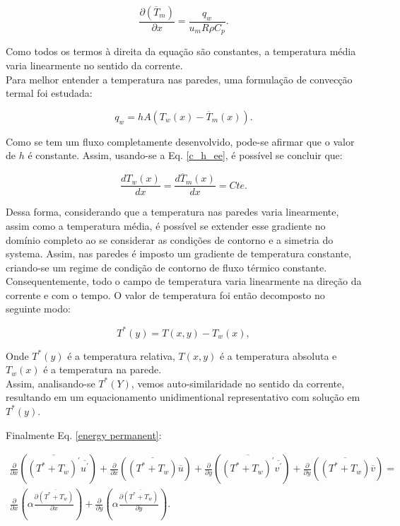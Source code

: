 \begin{equation}\label{c_h_ee}
\frac{\partial{\left(\overline{T}_m\right)}}{\partial{x}} = \frac{q_w}{u_m R \rho C_p}.
\end{equation}

Como todos os termos à direita da equação são constantes, a temperatura média varia linearmente no sentido da corrente.\\
Para melhor entender a temperatura nas paredes, uma formulação de convecção termal foi estudada:

\begin{equation}
q_w = h A \left( T_w(x) - \overline{T}_m(x)\right).
\end{equation}

Como se tem um fluxo completamente desenvolvido, pode-se afirmar que o valor de $h$ é constante. Assim, usando-se a Eq. \ref{c_h_ee}, é possível se concluir que:

\begin{equation}
\frac{d T_w(x)}{d x} = \frac{d \overline{T}_m(x)}{d x} = Cte.
\end{equation}	

Dessa forma, considerando que a temperatura nas paredes varia linearmente, assim como a temperatura média, é possível se extender esse gradiente no domínio completo ao se considerar as condições de contorno e a simetria do systema. Assim, nas paredes é imposto um gradiente de temperatura constante, criando-se um regime de condição de contorno de fluxo térmico constante. Consequentemente, todo o campo de temperatura varia linearmente na direção da corrente e com o tempo.
O valor de temperatura foi então decomposto no seguinte modo:

\begin{equation}
   T^\ast(y) = T(x,y) - T_w(x),
\end{equation}


 Onde $T^\ast(y)$ é a temperatura relativa, $T(x,y)$ é a temperatura absoluta e $T_w(x)$ é a temperatura na parede.\\

 Assim, analisando-se $T^\ast(Y)$, vemos auto-similaridade no sentido da corrente, resultando em um equacionamento unidimentional representativo com solução em $T^\ast(y)$.

 Finalmente Eq. \ref{energy permanent}:

\begin{equation}
\begin{split}
\frac{\partial{}}{\partial{x}} \left(\overline{(T^\ast + T_w)^\prime} \overline{ u^\prime}\right) + \frac{\partial{}}{\partial{x}}\left(\overline{(T^\ast + T_w)} \overline{u}\right)+ 
\frac{\partial{}}{\partial{y}} \left(\overline{(T^\ast + T_w)^\prime} \overline{ v^\prime}\right) + \frac{\partial{}}{\partial{y}}\left(\overline{(T^\ast + T_w)} \overline{v}\right) = \\
{\frac{\partial{}}{\partial{x}}} \left(\alpha {\frac{\partial{\overline{(T^\ast + T_w)}}}{\partial{x}}} \right) +
{\frac{\partial{}}{\partial{y}}} \left(\alpha {\frac{\partial{\overline{(T^\ast + T_w)}}}{\partial{y}}} \right). 
\end{split}
\end{equation}

